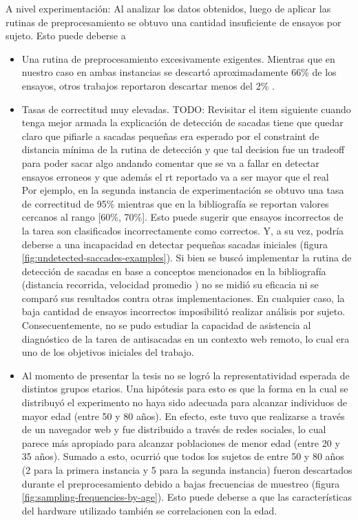 \begin{itemize}
\end{itemize}

A nivel experimentación: Al analizar los datos obtenidos, luego de aplicar las
rutinas de preprocesamiento se obtuvo una cantidad insuficiente de ensayos por
sujeto.
Esto puede deberse a 
\begin{itemize}
  \item Una rutina de preprocesamiento excesivamente exigentes.
  Mientras que en nuestro caso en ambas instancias se descartó aproximadamente
66\% de los ensayos, otros trabajos reportaron descartar menos del 2\%
\cite{unsworth_2011_distribution_analysis}. 

  \item Tasas de correctitud muy elevadas.
    TODO: Revisitar el item siguiente cuando tenga mejor armada la explicación
          de detección de sacadas
          tiene que quedar claro que pifiarle a sacadas pequeñas era esperado
          por el constraint de distancia mínima de la rutina de detección y que
          tal decision fue un tradeoff para poder sacar algo andando comentar
          que se va a fallar en detectar ensayos erroneos y que además el rt
          reportado va a ser mayor que el real \\
    Por ejemplo, en la segunda instancia de experimentación se obtuvo una tasa
    de correctitud de 95\% mientras que en la bibliografía se reportan valores
    cercanos al rango [60\%, 70\%].
    Esto puede sugerir que ensayos incorrectos de la tarea son clasificados
    incorrectamente como correctos.
    Y, a su vez, podría deberse a una incapacidad en detectar pequeñas sacadas
    iniciales (figura \ref{fig:undetected-saccades-examples}).
    Si bien se buscó implementar la rutina de detección de sacadas en base a
    conceptos mencionados en la bibliografía (distancia recorrida, velocidad
    promedio \cite{stuart_2019_saccade_detection_algorithms}) no se midió su
    eficacia ni se comparó sus resultados contra otras implementaciones.
    En cualquier caso, la baja cantidad de ensayos incorrectos imposibilitó
    realizar análisis por sujeto.
    Consecuentemente, no se pudo estudiar la capacidad de asistencia al
    diagnóstico de la tarea de antisacadas en un contexto web remoto, lo cual
    era uno de los objetivos iniciales del trabajo.

  \item Al momento de presentar la tesis no se logró la representatividad
esperada de distintos grupos etarios.
  Una hipótesis para esto es que la forma en la cual se distribuyó el
experimento no haya sido adecuada para alcanzar individuos de mayor edad (entre
50 y 80 años).
  En efecto, este tuvo que realizarse a través de un navegador web y fue
distribuido a través de redes sociales, lo cual parece más apropiado para
alcanzar poblaciones de menor edad (entre 20 y 35 años).
  Sumado a esto, ocurrió que todos los sujetos de entre 50 y 80 años (2 para la
primera instancia y 5 para la segunda instancia) fueron descartados durante el
preprocesamiento debido a bajas frecuencias de muestreo (figura
\ref{fig:sampling-frequencies-by-age}).
  Esto puede deberse a que las características del hardware utilizado también
se correlacionen con la edad.


\end{itemize}

